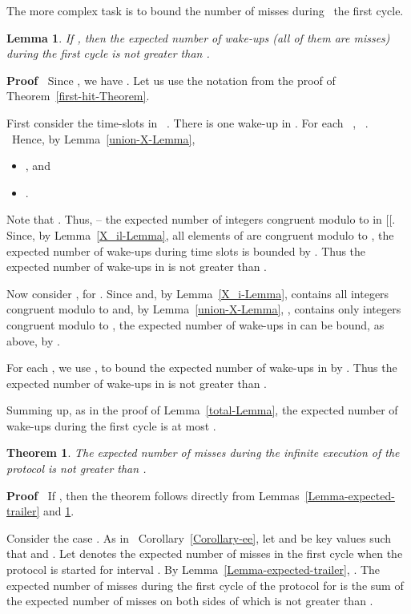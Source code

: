 \documentclass{article}
\newenvironment{proof}{\noindent\textbf{Proof\ }}{\hspace*{\fill}\medskip}
\newtheorem{lemma}{Lemma}
\newtheorem{theorem}{Theorem}
\begin{document}
The more complex task is to bound the number of misses during \ the first
cycle.

\begin{lemma}
  \label{Lemma-expected-init}If , then the expected number of wake-ups (all of them are misses)
  during the first cycle is not greater than .
\end{lemma}

\begin{proof}
  Since , we have . Let us use the notation from the proof of
  Theorem~\ref{first-hit-Theorem}.
  
  First consider the time-slots in \ . There is one wake-up in . For each \ , \ . \ Hence, by
  Lemma~\ref{union-X-Lemma}, 
\begin{itemize}
  \item
  , and
\item 
  .
\end{itemize}
 Note that
  . Thus,  -- the expected number of integers
  congruent modulo  to  in
  [[. Since, by Lemma~\ref{X_il-Lemma}, all elements of  are congruent modulo  to , the expected number of wake-ups during time slots 
  is bounded by . Thus the expected number of wake-ups in  is not
  greater than .
  
  Now consider , for . Since  and, by Lemma~\ref{X_i-Lemma},
   contains all integers congruent modulo  to
   and, by Lemma~\ref{union-X-Lemma}, , contains only integers congruent modulo 
  to , the expected number of wake-ups in  can be bound, as above, by .
  
  For each , we use , to bound the
  expected number of wake-ups in  by . Thus the expected
  number of wake-ups in  is not greater than .
  
  Summing up, as in the proof of Lemma~\ref{total-Lemma}, the expected
  number of wake-ups during the first cycle is at most .
\end{proof}

\begin{theorem}
  \label{Theorem-expected}The expected number of misses during the infinite
  execution of the protocol is not greater than .
\end{theorem}

\begin{proof}
  If , then the theorem
  follows directly from Lemmas~\ref{Lemma-expected-trailer} and
  \ref{Lemma-expected-init}.
  
  Consider the case .
  As in \ Corollary~\ref{Corollary-ee}, let  and  be key
  values such that  and . Let  denotes the
  expected number of misses in the first cycle when the protocol is started
  for interval . By Lemma~\ref{Lemma-expected-trailer},
  . The expected
  number of misses during the first cycle of the protocol for  is the sum of the expected number of misses on both sides of
   which is not greater than . 
\end{proof}
\end{document}
